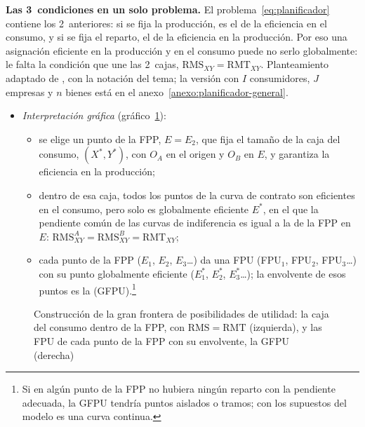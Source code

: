 \documentclass[11pt]{article}
\begin{document}
\begin{anotaciones}
\textbf{Las 3~condiciones en un solo problema.} El problema~\eqref{eq:planificador} contiene los 2~anteriores: si se fija la producción, es el de la eficiencia en el consumo, y si se fija el reparto, el de la eficiencia en la producción. Por eso una asignación eficiente en la producción y en el consumo puede no serlo globalmente: le falta la condición que une las 2~cajas, $\mathrm{RMS}_{XY}=\mathrm{RMT}_{XY}$. Planteamiento adaptado de \textcite{MatePerez2007Microeconomia}, con la notación del tema; la versión con $I$ consumidores, $J$ empresas y $n$ bienes está en el anexo~\ref{anexo:planificador-general}.
\end{anotaciones}

\begin{itemize}
\item \emph{Interpretación gráfica} (gráfico~\ref{fig:gfpu}):
  \begin{itemize}
  \item se elige un punto de la FPP, $E=E_2$, que fija el tamaño de la caja del consumo, $(X^*,Y^*)$, con $O_A$ en el origen y $O_B$ en $E$, y garantiza la eficiencia en la producción;
  \item dentro de esa caja, todos los puntos de la curva de contrato son eficientes en el consumo, pero solo es globalmente eficiente $E^*$, en el que la pendiente común de las curvas de indiferencia es igual a la de la FPP en $E$: $\mathrm{RMS}^A_{XY}=\mathrm{RMS}^B_{XY}=\mathrm{RMT}_{XY}$;
  \item cada punto de la FPP ($E_1$, $E_2$, $E_3$\ldots) da una FPU (FPU$_1$, FPU$_2$, FPU$_3$\ldots) con su punto globalmente eficiente ($E^*_1$, $E^*_2$, $E^*_3$\ldots); la envolvente de esos puntos es la  (GFPU).\footnote{Si en algún punto de la FPP no hubiera ningún reparto con la pendiente adecuada, la GFPU tendría puntos aislados o tramos; con los supuestos del modelo es una curva continua\nocite{Bator1957Simple}.}
  \end{itemize}
\end{itemize}

\begin{figure}[H]
\centering
\caption{Construcción de la gran frontera de posibilidades de utilidad: la caja del consumo dentro de la FPP, con $\mathrm{RMS}=\mathrm{RMT}$ (izquierda), y las FPU de cada punto de la FPP con su envolvente, la GFPU (derecha)}\label{fig:gfpu}
\end{figure}
\end{document}
